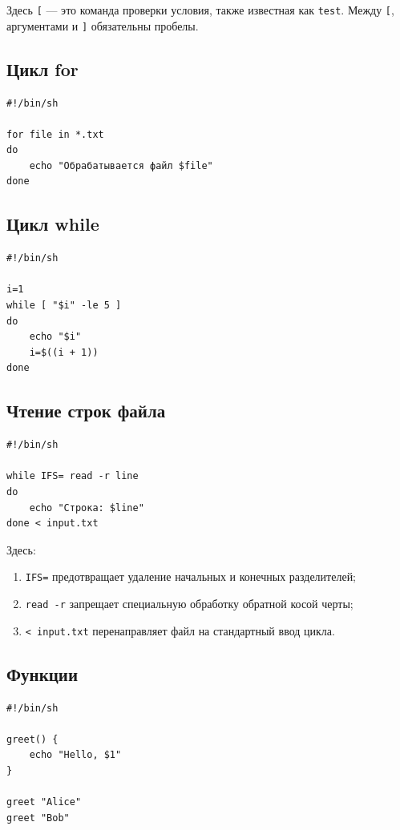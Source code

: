 \documentclass[12pt,a4paper]{article}
\begin{document}
Здесь \texttt{[} --- это команда проверки условия, также известная как \texttt{test}. Между \texttt{[}, аргументами и \texttt{]} обязательны пробелы.

\subsection{Цикл for}

\begin{lstlisting}
#!/bin/sh

for file in *.txt
do
    echo "Обрабатывается файл $file"
done
\end{lstlisting}

\subsection{Цикл while}

\begin{lstlisting}
#!/bin/sh

i=1
while [ "$i" -le 5 ]
do
    echo "$i"
    i=$((i + 1))
done
\end{lstlisting}

\subsection{Чтение строк файла}

\begin{lstlisting}
#!/bin/sh

while IFS= read -r line
do
    echo "Строка: $line"
done < input.txt
\end{lstlisting}

Здесь:
\begin{enumerate}
    \item \texttt{IFS=} предотвращает удаление начальных и конечных разделителей;
    \item \texttt{read -r} запрещает специальную обработку обратной косой черты;
    \item \texttt{< input.txt} перенаправляет файл на стандартный ввод цикла.
\end{enumerate}

\subsection{Функции}

\begin{lstlisting}
#!/bin/sh

greet() {
    echo "Hello, $1"
}

greet "Alice"
greet "Bob"
\end{lstlisting}
\end{document}
